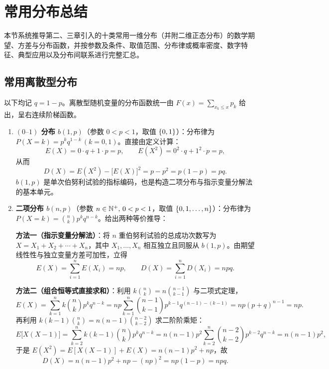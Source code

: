 \section{常用分布总结}
\label{sec:distribution-summary}

本节系统推导第二、三章引入的十类常用一维分布（并附二维正态分布）的数学期望、方差与分布函数，并按参数及条件、取值范围、分布律或概率密度、数字特征、典型应用以及分布间联系进行完整汇总。

\subsection{常用离散型分布}

以下均记 $q=1-p$。离散型随机变量的分布函数统一由 $F(x)=\sum_{x_k\le x}p_k$ 给出，呈右连续阶梯函数。

\begin{enumerate}
  \item \textbf{$(0\text{--}1)$ 分布 $b(1,p)$}（参数 $0<p<1$，取值 $\{0,1\}$）：分布律为 $P(X=k)=p^k q^{1-k}\,(k=0,1)$。直接由定义计算：
  \[
    E(X)=0\cdot q+1\cdot p=p,\qquad
    E(X^2)=0^2\cdot q+1^2\cdot p=p,
  \]
  从而
  \[
    D(X)=E(X^2)-\bigl[E(X)\bigr]^2=p-p^2=p(1-p)=pq.
  \]
  $b(1,p)$ 是单次伯努利试验的指标编码，也是构造二项分布与指示变量分解法的基本单元。

  \item \textbf{二项分布 $b(n,p)$}（参数 $n\in\mathbb{N}^+,\,0<p<1$，取值 $\{0,1,\ldots,n\}$）：分布律为 $P(X=k)=\binom{n}{k}p^k q^{n-k}$。给出两种等价推导：

  \textbf{方法一（指示变量分解法）}：将 $n$ 重伯努利试验的总成功次数写为 $X=X_1+X_2+\cdots+X_n$，其中 $X_1,\ldots,X_n$ 相互独立且同服从 $b(1,p)$。由期望线性性与独立变量方差可加性，立得
  \[
    E(X)=\sum_{i=1}^{n}E(X_i)=np,\qquad
    D(X)=\sum_{i=1}^{n}D(X_i)=npq.
  \]

  \textbf{方法二（组合恒等式直接求和）}：利用 $k\binom{n}{k}=n\binom{n-1}{k-1}$ 与二项式定理，
  \[
    E(X)=\sum_{k=1}^{n}k\binom{n}{k}p^k q^{n-k}
    =np\sum_{k=1}^{n}\binom{n-1}{k-1}p^{k-1}q^{(n-1)-(k-1)}
    =np(p+q)^{n-1}=np.
  \]
  再利用 $k(k-1)\binom{n}{k}=n(n-1)\binom{n-2}{k-2}$ 求二阶阶乘矩：
  \[
    E\bigl[X(X-1)\bigr]=\sum_{k=2}^{n}k(k-1)\binom{n}{k}p^k q^{n-k}
    =n(n-1)p^2\sum_{k=2}^{n}\binom{n-2}{k-2}p^{k-2}q^{n-k}
    =n(n-1)p^2,
  \]
  于是 $E(X^2)=E[X(X-1)]+E(X)=n(n-1)p^2+np$，故
  \[
    D(X)=n(n-1)p^2+np-(np)^2=np(1-p)=npq.
  \]


\end{enumerate}

